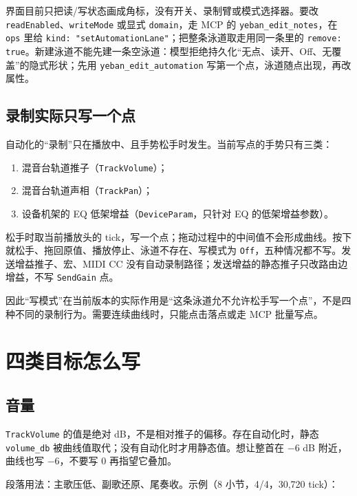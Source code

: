 界面目前只把读/写状态画成角标，没有开关、录制臂或模式选择器。要改 \texttt{readEnabled}、\texttt{writeMode} 或显式 \texttt{domain}，走 MCP 的 \texttt{yeban\_edit\_notes}，在 \texttt{ops} 里给 \texttt{kind: "set\allowbreak Automation\allowbreak Lane"}；把整条泳道取走用同一条里的 \texttt{remove: true}。新建泳道不能先建一条空泳道：模型拒绝持久化“无点、读开、Off、无覆盖”的隐式形状；先用 \texttt{yeban\_edit\_automation} 写第一个点，泳道随点出现，再改属性。

\subsection{录制实际只写一个点}

自动化的“录制”只在播放中、且手势松手时发生。当前写点的手势只有三类：

\begin{enumerate}
  \item 混音台轨道推子（\texttt{TrackVolume}）；
  \item 混音台轨道声相（\texttt{TrackPan}）；
  \item 设备机架的 EQ 低架增益（\texttt{DeviceParam}，只针对 EQ 的低架增益参数）。
\end{enumerate}

松手时取当前播放头的 tick，写一个点；拖动过程中的中间值不会形成曲线。按下就松手、拖回原值、播放停止、泳道不存在、写模式为 \texttt{Off}，五种情况都不写。发送增益推子、宏、MIDI CC 没有自动录制路径；发送增益的静态推子只改路由边增益，不写 \texttt{SendGain} 点。

因此“写模式”在当前版本的实际作用是“这条泳道允不允许松手写一个点”，不是四种不同的录制行为。需要连续曲线时，只能点击落点或走 MCP 批量写点。

\section{四类目标怎么写}

\subsection{音量}

\texttt{TrackVolume} 的值是绝对 dB，不是相对推子的偏移。存在自动化时，静态 \texttt{volume\_db} 被曲线值取代；没有自动化时才用静态值。想让整首在 $-6$ dB 附近，曲线也写 $-6$，不要写 $0$ 再指望它叠加。

段落用法：主歌压低、副歌还原、尾奏收。示例（8 小节，4/4，30{,}720 tick）：


